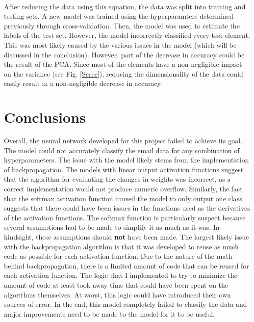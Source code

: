 \documentclass[12pt]{article}
\begin{document}
    \paragraph{} 
    After reducing the data using this equation, the data was split into training and testing sets. A new model was trained using the hyperparamters determined previously through cross-validation. Then, the model was used to estimate the labels of the test set. However, the model incorrectly classified every test element. This was most likely caused by the various issues in the model (which will be discussed in the conclusion). However, part of the decrease in accuracy could be the result of the PCA. Since most of the elements have a non-negligible impact on the variance (see Fig. \ref{Scree}), reducing the dimensionality of the data could easily result in a non-negligible decrease in accuracy. 
    	
	\section{Conclusions}
	Overall, the neural network developed for this project failed to achieve its goal. The model could not accurately classify the email data for any combination of hyperparameters. The issue with the model likely stems from the implementation of backpropagation. The models with linear output activation functions suggest that the algorithm for evaluating the changes in weights was incorrect, as a correct implementation would not produce numeric overflow. Similarly, the fact that the softmax activation function caused the model to only output one class suggests that there could have been issues in the functions used as the derivatives of the activation functions. The softmax function is particularly suspect because several assumptions had to be made to simplify it as much as it was. In hindsight, these assumptions should \textbf{not} have been made. The largest likely issue with the backpropagation algorithm is that it was developed to reuse as much code as possible for each activation function. Due to the nature of the math behind backpropagation, there is a limited amount of code that can be reused for each activation function. The logic that I implemented to try to minimize the amount of code at least took away time that could have been spent on the algorithms themselves. At worst, this logic could have introduced their own sources of error. In the end, this model completely failed to classify the data and major improvements need to be made to the model for it to be useful.
	\pagebreak
\end{document}
